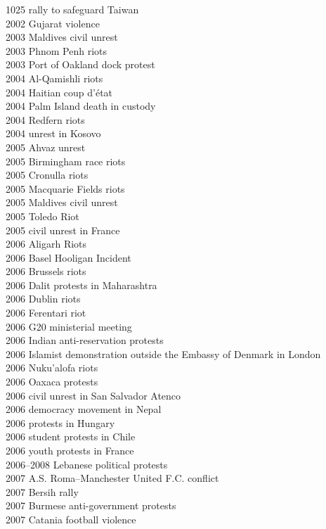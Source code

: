 1025 rally to safeguard Taiwan\\
2002 Gujarat violence\\
2003 Maldives civil unrest\\
2003 Phnom Penh riots\\
2003 Port of Oakland dock protest\\
2004 Al-Qamishli riots\\
2004 Haitian coup d'état\\
2004 Palm Island death in custody\\
2004 Redfern riots\\
2004 unrest in Kosovo\\
2005 Ahvaz unrest\\
2005 Birmingham race riots\\
2005 Cronulla riots\\
2005 Macquarie Fields riots\\
2005 Maldives civil unrest\\
2005 Toledo Riot\\
2005 civil unrest in France\\
2006 Aligarh Riots\\
2006 Basel Hooligan Incident\\
2006 Brussels riots\\
2006 Dalit protests in Maharashtra\\
2006 Dublin riots\\
2006 Ferentari riot\\
2006 G20 ministerial meeting\\
2006 Indian anti-reservation protests\\
2006 Islamist demonstration outside the Embassy of Denmark in London\\
2006 Nuku'alofa riots\\
2006 Oaxaca protests\\
2006 civil unrest in San Salvador Atenco\\
2006 democracy movement in Nepal\\
2006 protests in Hungary\\
2006 student protests in Chile\\
2006 youth protests in France\\
2006–2008 Lebanese political protests\\
2007 A.S. Roma–Manchester United F.C. conflict\\
2007 Bersih rally\\
2007 Burmese anti-government protests\\
2007 Catania football violence\\
